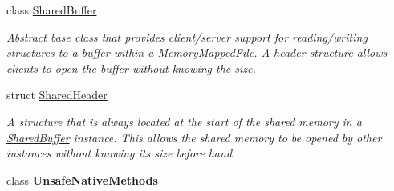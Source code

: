 \begin{DoxyCompactItemize}
class \hyperlink{class_shared_memory_1_1_shared_buffer}{Shared\+Buffer}
\begin{DoxyCompactList}\small\item\em Abstract base class that provides client/server support for reading/writing structures to a buffer within a Memory\+Mapped\+File. A header structure allows clients to open the buffer without knowing the size. \end{DoxyCompactList}\item 
struct \hyperlink{struct_shared_memory_1_1_shared_header}{Shared\+Header}
\begin{DoxyCompactList}\small\item\em A structure that is always located at the start of the shared memory in a \hyperlink{class_shared_memory_1_1_shared_buffer}{Shared\+Buffer} instance. This allows the shared memory to be opened by other instances without knowing its size before hand. \end{DoxyCompactList}\item 
class {\bfseries Unsafe\+Native\+Methods}
\end{DoxyCompactItemize}
